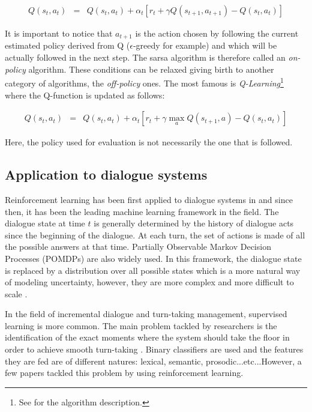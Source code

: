 				\begin{eqnarray}
					Q(s_t,a_t) & = & Q(s_t,a_t) + \alpha_t [r_t + \gamma Q(s_{t+1},a_{t+1}) - Q(s_t,a_t)] \label{eq:sarsaupdate}
				\end{eqnarray}
				
				It is important to notice that $a_{t+1}$ is the action chosen by following the current estimated policy derived from Q ($\epsilon$-greedy for example) and which will be actually followed in the next step. The sarsa algorithm is therefore called an \textit{on-policy} algorithm. These conditions can be relaxed giving birth to another category of algorithms, the \textit{off-policy} ones. The most famous is \textit{Q-Learning}\footnote{See \cite{Sutton1998} for the algorithm description.} \cite{Watkins1989} where the Q-function is updated as follows:
				
				\begin{eqnarray}
					Q(s_t,a_t) & = & Q(s_t,a_t) + \alpha_t [r_t + \gamma \max_a Q(s_{t+1},a) - Q(s_t,a_t)] \label{eq:qlearningupdate}
				\end{eqnarray}
				
				Here, the policy used for evaluation is not necessarily the one that is followed.

    \subsection{Application to dialogue systems}
    
    	Reinforcement learning has been first applied to dialogue systems in \cite{Levin1997} and since then, it has been the leading machine learning framework in the field. The dialogue state at time $t$ is generally determined by the history of dialogue acts since the beginning of the dialogue. At each turn, the set of actions is made of all the possible answers at that time. Partially Observable Markov Decision Processes (POMDPs) \cite{Williams2007} are also widely used. In this framework, the dialogue state is replaced by a distribution over all possible states which is a more natural way of modeling uncertainty, however, they are more complex and more difficult to scale \cite{Lemon2007}.
        
        In the field of incremental dialogue and turn-taking management, supervised learning is more common. The main problem tackled by researchers is the identification of the exact moments where the system should take the floor in order to achieve smooth turn-taking \cite{Raux2008,Gravano2011,Meena2013}. Binary classifiers are used and the features they are fed are of different natures: lexical, semantic, prosodic...etc...However, a few papers tackled this problem by using reinforcement learning.
        
